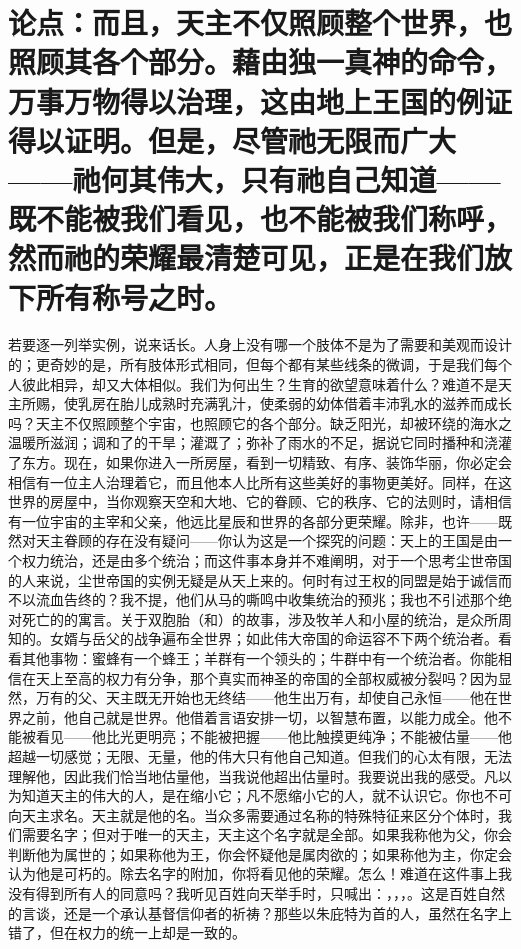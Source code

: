 \section{论点：而且，天主不仅照顾整个世界，也照顾其各个部分。藉由独一真神的命令，万事万物得以治理，这由地上王国的例证得以证明。但是，尽管祂无限而广大——祂何其伟大，只有祂自己知道——既不能被我们看见，也不能被我们称呼，然而祂的荣耀最清楚可见，正是在我们放下所有称号之时。}

若要逐一列举实例，说来话长。人身上没有哪一个肢体不是为了需要和美观而设计的；更奇妙的是，所有肢体形式相同，但每个都有某些线条的微调，于是我们每个人彼此相异，却又大体相似。我们为何出生？生育的欲望意味着什么？难道不是天主所赐，使乳房在胎儿成熟时充满乳汁，使柔弱的幼体借着丰沛乳水的滋养而成长吗？天主不仅照顾整个宇宙，也照顾它的各个部分。缺乏阳光，却被环绕的海水之温暖所滋润；调和了的干旱；灌溉了；弥补了雨水的不足，据说它同时播种和浇灌了东方。现在，如果你进入一所房屋，看到一切精致、有序、装饰华丽，你必定会相信有一位主人治理着它，而且他本人比所有这些美好的事物更美好。同样，在这世界的房屋中，当你观察天空和大地、它的眷顾、它的秩序、它的法则时，请相信有一位宇宙的主宰和父亲，他远比星辰和世界的各部分更荣耀。除非，也许——既然对天主眷顾的存在没有疑问——你认为这是一个探究的问题：天上的王国是由一个权力统治，还是由多个统治；而这件事本身并不难阐明，对于一个思考尘世帝国的人来说，尘世帝国的实例无疑是从天上来的。何时有过王权的同盟是始于诚信而不以流血告终的？我不提，他们从马的嘶鸣中收集统治的预兆；我也不引述那个绝对死亡的的寓言。关于双胞胎（和）的故事，涉及牧羊人和小屋的统治，是众所周知的。女婿与岳父的战争遍布全世界；如此伟大帝国的命运容不下两个统治者。看看其他事物：蜜蜂有一个蜂王；羊群有一个领头的；牛群中有一个统治者。你能相信在天上至高的权力有分争，那个真实而神圣的帝国的全部权威被分裂吗？因为显然，万有的父、天主既无开始也无终结——他生出万有，却使自己永恒——他在世界之前，他自己就是世界。他借着言语安排一切，以智慧布置，以能力成全。他不能被看见——他比光更明亮；不能被把握——他比触摸更纯净；不能被估量——他超越一切感觉；无限、无量，他的伟大只有他自己知道。但我们的心太有限，无法理解他，因此我们恰当地估量他，当我说他超出估量时。我要说出我的感受。凡以为知道天主的伟大的人，是在缩小它；凡不愿缩小它的人，就不认识它。你也不可向天主求名。天主就是他的名。当众多需要通过名称的特殊特征来区分个体时，我们需要名字；但对于唯一的天主，天主这个名字就是全部。如果我称他为父，你会判断他为属世的；如果称他为王，你会怀疑他是属肉欲的；如果称他为主，你定会认为他是可朽的。除去名字的附加，你将看见他的荣耀。怎么！难道在这件事上我没有得到所有人的同意吗？我听见百姓向天举手时，只喊出：，，，。这是百姓自然的言谈，还是一个承认基督信仰者的祈祷？那些以朱庇特为首的人，虽然在名字上错了，但在权力的统一上却是一致的。\par

